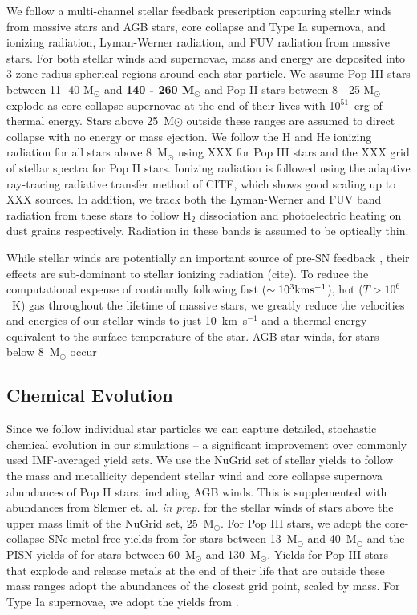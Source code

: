 \documentclass[12pt]{article} %
\begin{document}
We follow a multi-channel stellar feedback prescription capturing stellar winds from massive stars and AGB stars, core collapse and Type Ia supernova, and ionizing radiation, Lyman-Werner radiation, and FUV radiation from massive stars. For both stellar winds and supernovae, mass and energy are deposited into 3-zone radius spherical regions around each star particle. We assume Pop III stars between 11 -40 M$_{\odot}$ and \textbf{ 140 - 260 M$_{\odot}$ } and Pop II stars between 8 - 25 M$_{\odot}$ explode as core collapse supernovae at the end of their lives with 10$^{51}$~erg of thermal energy. Stars above 25~M${\odot}$ outside these ranges are assumed to direct collapse with no energy or mass ejection. We follow the H and He ionizing radiation for all stars above 8~M$_{\odot}$ using XXX for Pop III stars and the XXX grid of stellar spectra for Pop II stars. Ionizing radiation is followed using the adaptive ray-tracing radiative transfer method of CITE, which shows good scaling up to XXX sources. In addition, we track both the Lyman-Werner and FUV band radiation from these stars to follow H$_2$ dissociation and photoelectric heating on dust grains respectively. Radiation in these bands is assumed to be optically thin.

While stellar winds are potentially an important source of pre-SN feedback \citep{Agertz2013}, their effects are sub-dominant to stellar ionizing radiation (cite). To reduce the computational expense of continually following fast ($\sim 10^{3} \rm{km} \rm{s}^{-1}$), hot ($T > 10^{6}$~K) gas throughout the lifetime of massive stars, we greatly reduce the velocities and energies of our stellar winds to just 10~km~s$^{-1}$ and a thermal energy equivalent to the surface temperature of the star. AGB star winds, for stars below 8~M$_{\odot}$ occur 

\subsection{Chemical Evolution}

Since we follow individual star particles we can capture detailed, stochastic chemical evolution in our simulations -- a significant improvement over commonly used IMF-averaged yield sets. We use the NuGrid set of stellar yields \citep{Pignatari2016,Ritter2018} to follow the mass and metallicity dependent stellar wind and core collapse supernova abundances of Pop II stars, including AGB winds. This is supplemented with abundances from Slemer et. al. \textit{in prep.} for the stellar winds of stars above the upper mass limit of the NuGrid set, 25~M$_{\odot}$. For Pop III stars, we adopt the core-collapse SNe metal-free yields from \cite{Nomoto2006} for stars between 13~M$_{\odot}$ and 40~M$_{\odot}$ and the PISN yields of \cite{HegerWoosley2002} for stars between 60~M$_{\odot}$ and 130~M$_{\odot}$. Yields for Pop III stars that explode and release metals at the end of their life that are outside these mass ranges adopt the abundances of the closest grid point, scaled by mass. For Type Ia supernovae, we adopt the yields from \cite{NomoYokoi1986}. 
\end{document}
